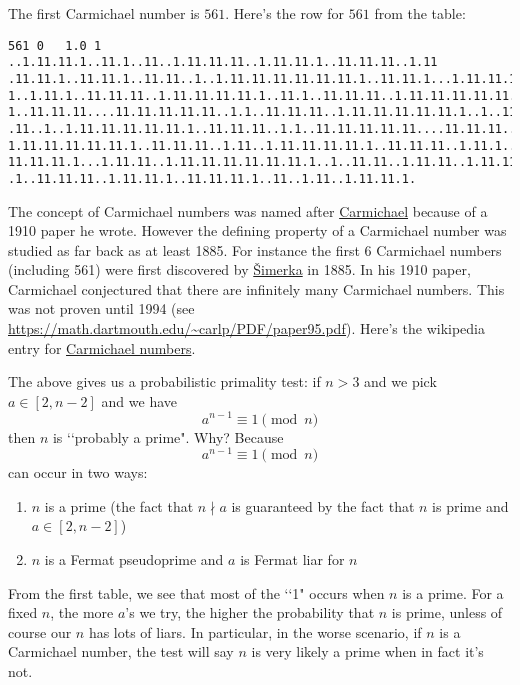 

The first Carmichael number is $561$. Here's the row for $561$
from the table:
\begin{Verbatim}[frame=single,fontsize=\footnotesize]
561 0   1.0 1 ..1.11.11.1..11.1..11..1.11.11.11..1.11.11.1..11.11.11..1.11
.11.11.1..11.11.1..11.11..1..1.11.11.11.11.11.11.1..11.11.1...1.11.11.11.1
1..1.11.1..11.11.11..1.11.11.11.11.1..11.1..11.11.11..1.11.11.11.11.11.11.
1..11.11.11....11.11.11.11.11..1.1..11.11.11..1.11.11.11.11.11.1..1..11.11
.11..1..1.11.11.11.11.11.1..11.11.11..1.1..11.11.11.11.11....11.11.11..1.1
1.11.11.11.11.11.1..11.11.11..1.11..1.11.11.11.11.1..11.11.11..1.11.1..11.
11.11.11.1...1.11.11..1.11.11.11.11.11.11.1..1..11.11..1.11.11..1.11.11.11
.1..11.11.11..1.11.11.1..11.11.11.1..11..1.11..1.11.11.1.
\end{Verbatim}

The concept of Carmichael numbers was named after
\href{https://en.wikipedia.org/wiki/Robert_Daniel_Carmichael}{Carmichael}
because of a 1910 paper he wrote.
However the defining property of a Carmichael number was studied as far back
as at least 1885.
For instance the first 6 Carmichael numbers (including 561) were
first discovered by
\href{https://en.wikipedia.org/wiki/V%C3%A1clav_%C5%A0imerka}{\v{S}imerka}
in 1885.
In his 1910 paper,
Carmichael conjectured that there are infinitely many Carmichael numbers.
This was not proven until 1994
(see \url{https://math.dartmouth.edu/~carlp/PDF/paper95.pdf}).
Here's the wikipedia entry for
\href{https://en.wikipedia.org/wiki/Carmichael_number}{Carmichael numbers}.



The above gives us a probabilistic primality test:
if $n > 3$ and we pick $a \in [2, n-2]$ and we have
\[
a^{n-1} \equiv 1 \pmod{n}
\]
then $n$ is \lq\lq probably a prime".
Why?
Because
\[
a^{n-1} \equiv 1 \pmod{n}
\]
can occur in two ways:
\begin{enumerate}[nosep]
\item $n$ is a prime (the fact that $n \nmid a$ is guaranteed by the fact that
  $n$ is prime and $a \in [2, n-2]$)
\item $n$ is a Fermat pseudoprime and $a$ is Fermat liar for $n$
\end{enumerate}
From the first table, we see that most of the \lq\lq 1" occurs when
$n$ is a prime.
For a fixed $n$,
the more $a$'s we try, the higher the probability that $n$ is prime,
unless of course our $n$ has lots of liars.
In particular, in the worse scenario, if $n$ is a Carmichael number,
the test will say $n$ is very likely a prime when in fact it's not.

